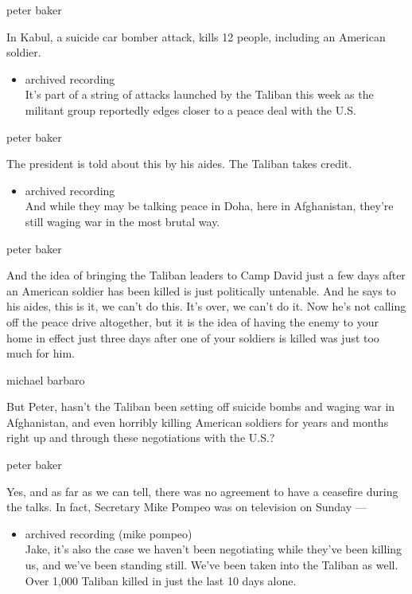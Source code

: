 peter baker

In Kabul, a suicide car bomber attack, kills 12 people, including an
American soldier.

\begin{itemize}
\tightlist
\item
  archived recording\\
  It's part of a string of attacks launched by the Taliban this week as
  the militant group reportedly edges closer to a peace deal with the
  U.S.
\end{itemize}

peter baker

The president is told about this by his aides. The Taliban takes credit.

\begin{itemize}
\tightlist
\item
  archived recording\\
  And while they may be talking peace in Doha, here in Afghanistan,
  they're still waging war in the most brutal way.
\end{itemize}

peter baker

And the idea of bringing the Taliban leaders to Camp David just a few
days after an American soldier has been killed is just politically
untenable. And he says to his aides, this is it, we can't do this. It's
over, we can't do it. Now he's not calling off the peace drive
altogether, but it is the idea of having the enemy to your home in
effect just three days after one of your soldiers is killed was just too
much for him.

michael barbaro

But Peter, hasn't the Taliban been setting off suicide bombs and waging
war in Afghanistan, and even horribly killing American soldiers for
years and months right up and through these negotiations with the U.S.?

peter baker

Yes, and as far as we can tell, there was no agreement to have a
ceasefire during the talks. In fact, Secretary Mike Pompeo was on
television on Sunday ---

\begin{itemize}
\tightlist
\item
  archived recording (mike pompeo)\\
  Jake, it's also the case we haven't been negotiating while they've
  been killing us, and we've been standing still. We've been taken into
  the Taliban as well. Over 1,000 Taliban killed in just the last 10
  days alone.
\end{itemize}

